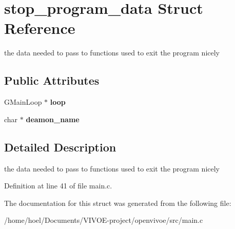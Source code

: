 \hypertarget{structstop__program__data}{}\section{stop\+\_\+program\+\_\+data Struct Reference}
\label{structstop__program__data}


the data needed to pass to functions used to exit the program nicely  


\subsection*{Public Attributes}
\begin{DoxyCompactItemize}
\item 
G\+Main\+Loop $\ast$ {\bfseries loop}\hypertarget{structstop__program__data_a66ae815f1449908c18a8b117e4d08f3c}{}\label{structstop__program__data_a66ae815f1449908c18a8b117e4d08f3c}

\item 
char $\ast$ {\bfseries deamon\+\_\+name}\hypertarget{structstop__program__data_a381012de74d8cc7bace6f5e0c2080ec7}{}\label{structstop__program__data_a381012de74d8cc7bace6f5e0c2080ec7}

\end{DoxyCompactItemize}


\subsection{Detailed Description}
the data needed to pass to functions used to exit the program nicely 

Definition at line 41 of file main.\+c.



The documentation for this struct was generated from the following file\+:\begin{DoxyCompactItemize}
\item 
/home/hoel/\+Documents/\+V\+I\+V\+O\+E-\/project/openvivoe/src/main.\+c\end{DoxyCompactItemize}
